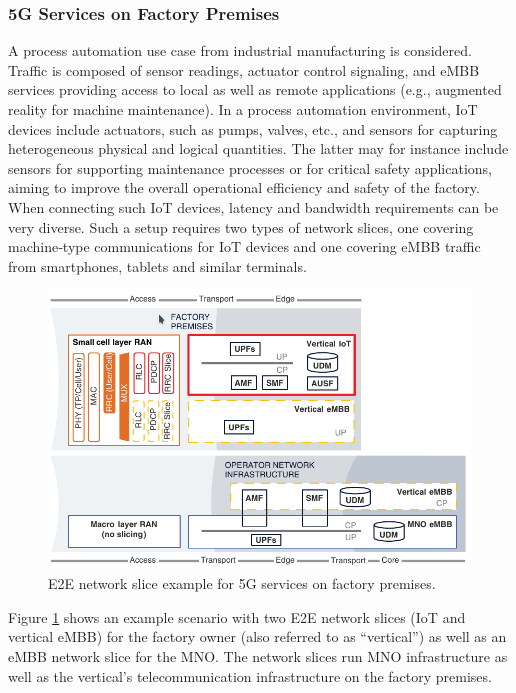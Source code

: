 \documentclass{report}
\begin{document}
\subsubsection{5G Services on Factory Premises}
A process automation use case from industrial manufacturing is considered. Traffic is composed of sensor readings, actuator control signaling, and eMBB services providing access to local as well as remote applications (e.g., augmented reality for machine maintenance).
In a process automation environment, IoT devices include actuators, such as pumps, valves, etc., and
sensors for capturing heterogeneous physical and logical quantities. The latter may for instance include sensors for supporting maintenance processes or for critical safety
applications, aiming to improve the overall operational efficiency and safety of the factory. When
connecting such IoT devices, latency and bandwidth requirements can be very diverse. Such a setup
requires two types of network slices, one covering machine‐type communications for IoT devices
and one covering eMBB traffic from smartphones, tablets and similar terminals. 
\begin{figure}
\centering
\includegraphics[scale=0.5]{pics/example.png}
\caption{E2E network slice example for 5G services on factory premises.}
\label{exem} 
\end{figure}
Figure \ref{exem} shows an example scenario with two E2E network slices (IoT and vertical eMBB) for the factory owner (also
referred to as “vertical”) as well as an eMBB network slice for the MNO. The network slices run MNO infrastructure as well as the vertical’s telecommunication infrastructure on the factory premises.
\end{document}
